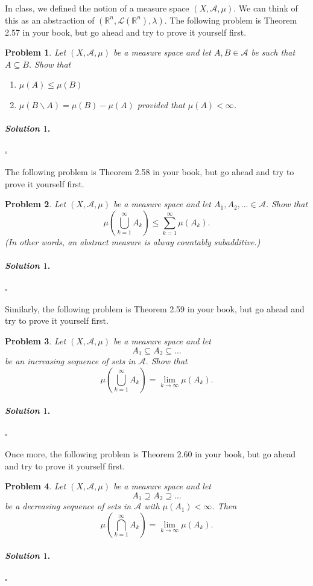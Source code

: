 \documentclass[reqno]{amsart}
\theoremstyle{plain}
\newtheorem{problem}{Problem}
\theoremstyle{definition}
\newenvironment{solution1}{\paragraph{\emph{Solution $1$}.}}{\hfill$\square$}
\begin{document}
In class, we defined the notion of a measure space $(X,\mathcal{A},\mu)$.  We can think of this as an abstraction of $(\mathbb{R}^{n},\mathcal{L}(\mathbb{R}^{n}),\lambda)$.  The following problem is Theorem 2.57 in your book, but go ahead and try to prove it yourself first.
\begin{problem}
Let $(X,\mathcal{A},\mu)$ be a measure space and let $A,B \in \mathcal{A}$ be such that $A \subseteq B$.  Show that
\begin{enumerate}
\item $\mu(A) \le \mu(B) $
\item $\mu(B \smallsetminus A) = \mu(B) - \mu(A)$ provided that $\mu(A) < \infty$.
\end{enumerate}
\end{problem}
\begin{solution1}

\end{solution1}

The following problem is Theorem 2.58 in your book, but go ahead and try to prove it yourself first.
\begin{problem}
Let $(X,\mathcal{A},\mu)$ be a measure space and let $A_{1}, A_{2}, \ldots \in \mathcal{A}$.  Show that
$$\mu \left( \bigcup_{k=1}^{\infty}A_{k}\right) \le \sum_{k=1}^{\infty} \mu(A_{k}). $$
(In other words, an abstract measure is alway countably subadditive.)
\end{problem}
\begin{solution1}

\end{solution1} 

Similarly, the following problem is Theorem 2.59 in your book, but go ahead and try to prove it yourself first.
\begin{problem}
Let $(X,\mathcal{A},\mu)$ be a measure space and let
$$A_{1} \subseteq A_{2} \subseteq \ldots $$
be an increasing sequence of sets in $\mathcal{A}$.  Show that
$$\mu \left( \bigcup_{k=1}^{\infty}A_{k}\right) = \lim_{k \to \infty} \mu(A_{k}). $$

\end{problem}
\begin{solution1}

\end{solution1}


Once more, the following problem is Theorem 2.60 in your book, but go ahead and try to prove it yourself first.
\begin{problem}
Let $(X,\mathcal{A},\mu)$ be a measure space and let
$$A_{1} \supseteq A_{2} \supseteq \ldots $$
be a decreasing sequence of sets in $\mathcal{A}$ with $\mu(A_{1}) < \infty$.  Then
$$\mu \left( \bigcap_{k=1}^{\infty} A_{k}\right) = \lim_{k \to \infty} \mu(A_{k}). $$
\end{problem}
\begin{solution1}

\end{solution1}
\end{document}
